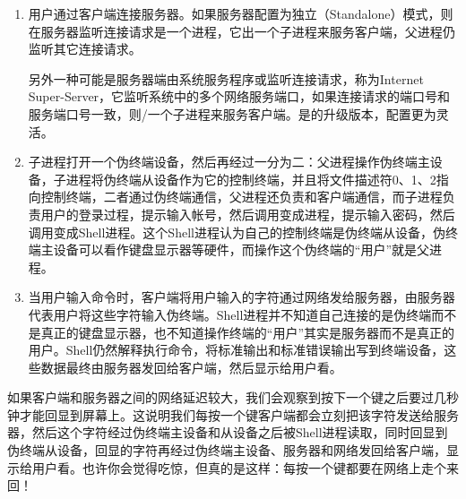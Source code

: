 \begin{enumerate}

\item 用户通过客户端连接服务器。如果服务器配置为独立（Standalone）模式，则在服务器监听连接请求是一个进程，它出一个子进程来服务客户端，父进程仍监听其它连接请求。



另外一种可能是服务器端由系统服务程序或监听连接请求，称为Internet Super-Server，它监听系统中的多个网络服务端口，如果连接请求的端口号和服务端口号一致，则/一个子进程来服务客户端。是的升级版本，配置更为灵活。

\item {}子进程打开一个伪终端设备，然后再经过一分为二：父进程操作伪终端主设备，子进程将伪终端从设备作为它的控制终端，并且将文件描述符0、1、2指向控制终端，二者通过伪终端通信，父进程还负责和客户端通信，而子进程负责用户的登录过程，提示输入帐号，然后调用变成进程，提示输入密码，然后调用变成Shell进程。这个Shell进程认为自己的控制终端是伪终端从设备，伪终端主设备可以看作键盘显示器等硬件，而操作这个伪终端的“用户”就是父进程。

\item 当用户输入命令时，客户端将用户输入的字符通过网络发给服务器，由服务器代表用户将这些字符输入伪终端。Shell进程并不知道自己连接的是伪终端而不是真正的键盘显示器，也不知道操作终端的“用户”其实是服务器而不是真正的用户。Shell仍然解释执行命令，将标准输出和标准错误输出写到终端设备，这些数据最终由服务器发回给客户端，然后显示给用户看。
\end{enumerate}


如果客户端和服务器之间的网络延迟较大，我们会观察到按下一个键之后要过几秒钟才能回显到屏幕上。这说明我们每按一个键客户端都会立刻把该字符发送给服务器，然后这个字符经过伪终端主设备和从设备之后被Shell进程读取，同时回显到伪终端从设备，回显的字符再经过伪终端主设备、服务器和网络发回给客户端，显示给用户看。也许你会觉得吃惊，但真的是这样：每按一个键都要在网络上走个来回！



